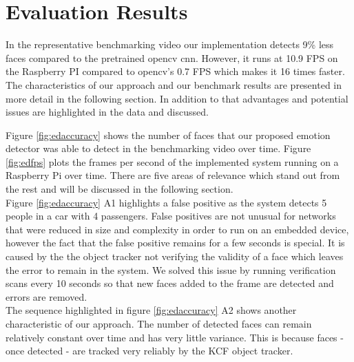 \section{Evaluation Results}
In the representative benchmarking video our implementation detects 9\% less faces compared to the pretrained \gls{opencv} \gls{cnn}. However, it runs at 10.9 FPS on the Raspberry PI compared to \gls{opencv}'s 0.7 FPS which makes it 16 times faster. The characteristics of our approach and our benchmark results are presented in more detail in the following section. In addition to that advantages and potential issues are highlighted in the data and discussed.\\
\begin{table}[H]
    \caption[Benchmark Results]{Benchmark Results (Definitions in \ref{tab:fdm})}\label{tab:edm}
\end{table}
Figure \ref{fig:edaccuracy} shows the number of faces that our proposed emotion detector was able to detect in the benchmarking video over time. Figure \ref{fig:edfps} plots the frames per second of the implemented system running on a Raspberry Pi over time. There are five areas of relevance which stand out from the rest and will be discussed in the following section.\\
Figure \ref{fig:edaccuracy} A1 highlights a false positive as the system detects 5 people in a car with 4 passengers. False positives are not unusual for networks that were reduced in size and complexity in order to run on an embedded device, however the fact that the false positive remains for a few seconds is special. It is caused by the the object tracker not verifying the validity of a face which leaves the error to remain in the system. We solved this issue by running verification scans every 10 seconds so that new faces added to the frame are detected and errors are removed.\\
The sequence highlighted in figure \ref{fig:edaccuracy} A2 shows another characteristic of our approach. The number of detected faces can remain relatively constant over time and has very little variance. This is because faces - once detected - are tracked very reliably by the KCF object tracker.\\

